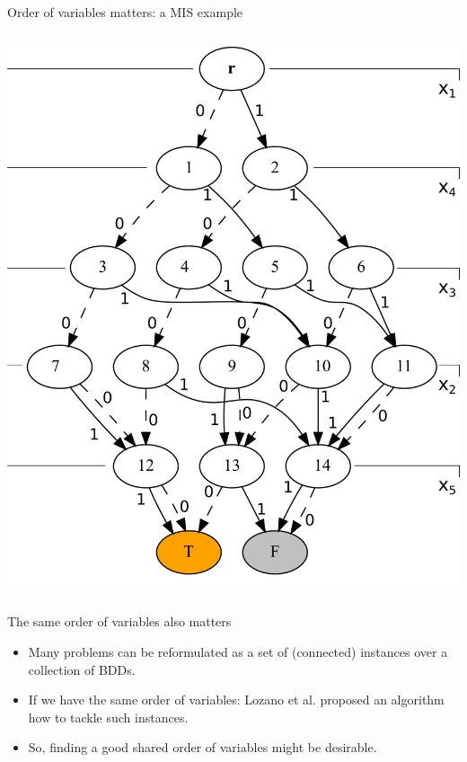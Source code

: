 \documentclass[10pt, xcolor=svgnames]{beamer}
\begin{document}
\begin{frame}[label={sec:orgdfb5132}]{Order of variables matters: a MIS example}
\begin{columns}
\begin{column}{0.55\columnwidth}
\includegraphics[height=0.7\textheight]{./img/BDDsampleRep2.png}
\end{column}
\end{columns}
\end{frame}
\begin{frame}[label={sec:org79d08cc}]{The \alert{same} order of variables also matters}
\begin{itemize}
\item Many problems can be reformulated as a set of (connected) instances
over a collection of BDDs.
\item If we have the same order of variables: Lozano et al. proposed an algorithm
how to tackle such instances.
\item So, finding a good shared order of variables might be desirable.
\end{itemize}
\end{frame}
\end{document}

